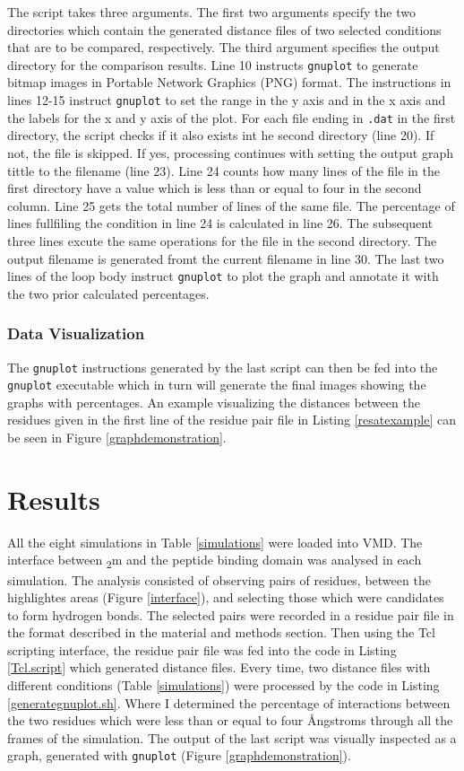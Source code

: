 \documentclass[11pt,twocolumn]{article}
\newcommand{\angstr}{{\AA}ngstroms\xspace}
\newcommand{\btm}{\textbeta\textsubscript{2}m\xspace}
\begin{document}
The script takes three arguments. The first two arguments specify the two
directories which contain the generated distance files of two selected
conditions that are to be compared, respectively. The third argument specifies
the output directory for the comparison results. Line 10 instructs
\texttt{gnuplot} to generate bitmap images in Portable Network Graphics (PNG)
format. The instructions in lines 12-15 instruct \texttt{gnuplot} to set the
range in the y axis and in the x axis  and the labels for the x and y axis of
the plot.  For each file ending in \texttt{.dat} in the first directory, the
script checks if it also exists int he second directory (line 20). If not, the
file is skipped. If yes, processing continues with setting the output graph
tittle to the filename (line 23). Line 24 counts how many lines of the file in
the first directory have a value which is less than or equal to four in the
second column. Line 25 gets the total number of lines of the same file. The
percentage of lines fullfiling the condition in line 24 is calculated in line
26. The subsequent three lines excute the same operations for the file in the
second directory. The output filename is generated fromt the current filename
in line 30. The last two lines of the loop body instruct \texttt{gnuplot} to
plot the graph and annotate it with the two prior calculated percentages.  

\subsubsection*{Data Visualization}

The \texttt{gnuplot} instructions generated by the last script can then be fed
into the \texttt{gnuplot} executable which in turn will generate the final
images showing the graphs with percentages. An example visualizing the
distances between the residues given in the first line of the residue pair file
in Listing \ref{resatexample} can be seen in Figure \ref{graphdemonstration}.


\section*{Results}

All the eight simulations in Table \ref{simulations} were loaded into VMD. The
interface between \btm and the peptide binding domain was analysed in each
simulation. The analysis consisted of observing pairs of residues, between the
highlightes areas (Figure \ref{interface}), and selecting those which were
candidates to form hydrogen bonds.  The selected pairs were recorded in a
residue pair file in the format described in the material and methods section.
Then using the Tcl scripting interface, the residue pair file was fed into the
code in Listing \ref{Tcl.script} which generated distance files. Every time,
two distance files with different conditions (Table \ref{simulations}) were
processed by the code in Listing \ref{generategnuplot.sh}. Where I determined
the percentage of interactions between the two residues which were less than or
equal to four \angstr through all the frames of the simulation. The output of
the last script  was visually inspected as a graph, generated with
\texttt{gnuplot} (Figure \ref{graphdemonstration}).
\end{document}
